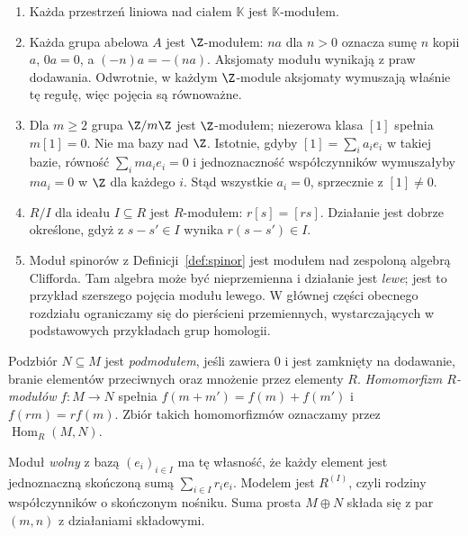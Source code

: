 \begin{przyklad}
\label{prz:moduly-podstawowe}
\begin{enumerate}[leftmargin=*]
\item Każda przestrzeń liniowa nad ciałem
      $\mathbb K$ jest $\mathbb K$-modułem.
\item Każda grupa abelowa $A$ jest $\Z$-modułem:
      $na$ dla $n>0$ oznacza sumę $n$ kopii $a$,
      $0a=0$, a $(-n)a=-(na)$. Aksjomaty modułu
      wynikają z praw dodawania. Odwrotnie,
      w każdym $\Z$-module aksjomaty wymuszają
      właśnie tę regułę, więc pojęcia są równoważne.
\item Dla $m\geq2$ grupa $\Z/m\Z$ jest $\Z$-modułem;
      niezerowa klasa $[1]$ spełnia $m[1]=0$. Nie ma bazy
      nad $\Z$. Istotnie, gdyby $[1]=\sum_i a_i e_i$ w takiej
      bazie, równość $\sum_i ma_i e_i=0$ i jednoznaczność
      współczynników wymuszałyby $ma_i=0$ w $\Z$ dla każdego $i$.
      Stąd wszystkie $a_i=0$, sprzecznie z $[1]\ne0$.
\item $R/I$ dla ideału $I\subseteq R$ jest
      $R$-modułem: $r[s]=[rs]$. Działanie jest
      dobrze określone, gdyż z $s-s'\in I$
      wynika $r(s-s')\in I$.
\item Moduł spinorów z Definicji~\ref{def:spinor}
      jest modułem nad zespoloną algebrą
      Clifforda. Tam algebra może być
      nieprzemienna i działanie jest \emph{lewe};
      jest to przykład szerszego pojęcia modułu lewego.
      W głównej części obecnego rozdziału ograniczamy się
      do pierścieni przemiennych, wystarczających
      w podstawowych przykładach grup homologii.
\end{enumerate}
\end{przyklad}

\begin{definicja}
\label{def:modul-map}
Podzbiór $N\subseteq M$ jest \emph{podmodułem}, jeśli zawiera $0$
i jest zamknięty na dodawanie, branie elementów przeciwnych
oraz mnożenie przez elementy $R$.
\emph{Homomorfizm $R$-modułów} $f:M\to N$ spełnia
$f(m+m')=f(m)+f(m')$ i $f(rm)=rf(m)$.
Zbiór takich homomorfizmów oznaczamy przez $\operatorname{Hom}_R(M,N)$.

Moduł \emph{wolny} z bazą $(e_i)_{i\in I}$ ma tę własność,
że każdy element jest jednoznaczną skończoną sumą
$\sum_{i\in I}r_i e_i$. Modelem jest $R^{(I)}$, czyli rodziny
współczynników o skończonym nośniku. Suma prosta $M\oplus N$
składa się z par $(m,n)$ z działaniami składowymi.
\end{definicja}

